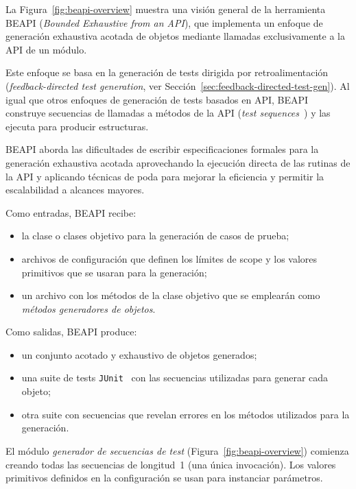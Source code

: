 La Figura~\ref{fig:beapi-overview} muestra una visión general de la herramienta 
\textsf{BEAPI} (\emph{Bounded Exhaustive from an API}), que implementa un enfoque 
de generación exhaustiva acotada de objetos mediante llamadas exclusivamente a 
la API de un módulo. 

Este enfoque se basa en la generación de tests dirigida por retroalimentación 
(\emph{feedback-directed test generation}, ver Sección~\ref{sec:feedback-directed-test-gen}). 
Al igual que otros enfoques de generación de tests basados en API, 
\textsf{BEAPI} construye secuencias de llamadas a métodos de la API 
(\emph{test sequences}~\cite{Ammann16}) y las ejecuta para producir estructuras.

\textsf{BEAPI} aborda las dificultades de escribir especificaciones formales 
para la generación exhaustiva acotada aprovechando la ejecución directa de las 
rutinas de la API y aplicando técnicas de poda para mejorar la eficiencia y 
permitir la escalabilidad a alcances mayores.

Como entradas, \textsf{BEAPI} recibe:
\begin{itemize}
    \item la clase o clases objetivo para la generación de casos de prueba;
    \item archivos de configuración que definen los límites de scope y los valores primitivos que se usaran para la generación;
    \item un archivo con los métodos de la clase objetivo que se emplearán 
    como \emph{métodos generadores de objetos}.
\end{itemize}

Como salidas, \textsf{BEAPI} produce:
\begin{itemize}
    \item un conjunto acotado y exhaustivo de objetos generados;
    \item una suite de tests \texttt{JUnit}~\cite{junit} con las secuencias 
    utilizadas para generar cada objeto;
    \item otra suite con secuencias que revelan errores en los métodos utilizados 
    para la generación.
\end{itemize}

El módulo \emph{generador de secuencias de test} (Figura~\ref{fig:beapi-overview}) 
comienza creando todas las secuencias de longitud~1 (una única invocación).  
Los valores primitivos definidos en la configuración se usan para instanciar 
parámetros.  


